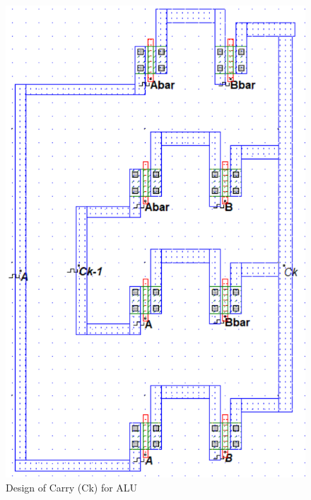 \documentclass[a4paper,12pt]{article}
\begin{document}
\begin{figure}[H]
	\centering
	\includegraphics[width=0.89\linewidth]{Images/ck}
	\caption{Design of Carry (Ck) for ALU}
	\label{fig:sk}
\end{figure}

	\newpage
\end{document}
